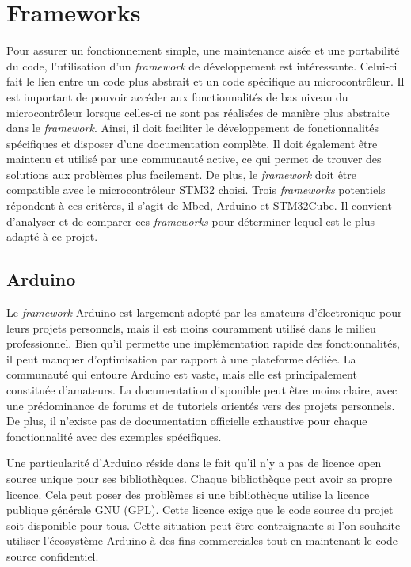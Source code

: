 \section{Frameworks}

Pour assurer un fonctionnement simple, une maintenance aisée et une portabilité du code, l'utilisation d'un \textit{framework} de développement est intéressante.
Celui-ci fait le lien entre un code plus abstrait et un code spécifique au microcontrôleur.
Il est important de pouvoir accéder aux fonctionnalités de bas niveau du microcontrôleur lorsque celles-ci ne sont pas réalisées de manière plus abstraite dans le \textit{framework}.
Ainsi, il doit faciliter le développement de fonctionnalités spécifiques et disposer d'une documentation complète.
Il doit également être maintenu et utilisé par une communauté active, ce qui permet de trouver des solutions aux problèmes plus facilement.
De plus, le \textit{framework} doit être compatible avec le microcontrôleur STM32 choisi.
Trois \textit{frameworks} potentiels répondent à ces critères, il s'agit de Mbed, Arduino et STM32Cube.
Il convient d'analyser et de comparer ces \textit{frameworks} pour déterminer lequel est le plus adapté à ce projet.

\subsection{Arduino}

Le \textit{framework} Arduino est largement adopté par les amateurs d'électronique pour leurs projets personnels, mais il est moins couramment utilisé dans le milieu professionnel.
Bien qu'il permette une implémentation rapide des fonctionnalités, il peut manquer d'optimisation par rapport à une plateforme dédiée.
La communauté qui entoure Arduino est vaste, mais elle est principalement constituée d'amateurs.
La documentation disponible peut être moins claire, avec une prédominance de forums et de tutoriels orientés vers des projets personnels.
De plus, il n'existe pas de documentation officielle exhaustive pour chaque fonctionnalité avec des exemples spécifiques.

Une particularité d'Arduino réside dans le fait qu'il n'y a pas de licence open source unique pour ses bibliothèques.
Chaque bibliothèque peut avoir sa propre licence.
Cela peut poser des problèmes si une bibliothèque utilise la licence publique générale GNU (GPL).
Cette licence exige que le code source du projet soit disponible pour tous.
Cette situation peut être contraignante si l'on souhaite utiliser l'écosystème Arduino à des fins commerciales tout en maintenant le code source confidentiel.

